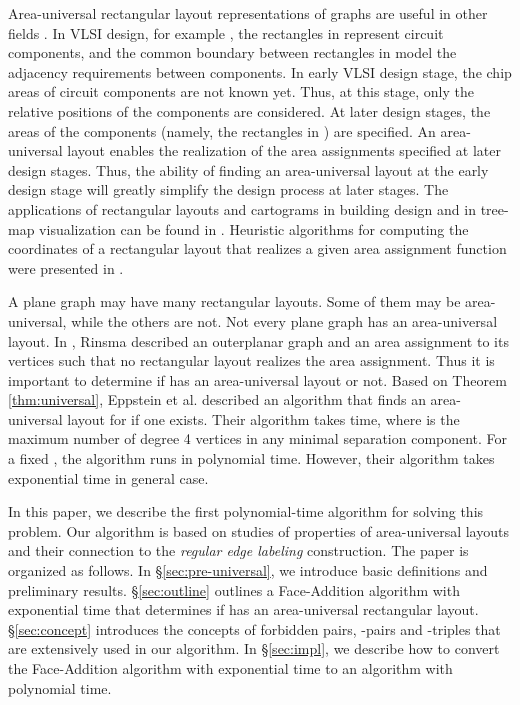 \documentclass[11pt]{article}
\begin{document}
Area-universal rectangular layout representations of graphs are useful
in other fields \cite{Mu08}. In VLSI design, for example \cite{YS95},
the rectangles in  represent circuit components, and the common
boundary between rectangles in  model the adjacency requirements
between components. In early VLSI design stage, the chip areas of circuit
components are not known yet. Thus, at this stage, only the relative
positions of the components are considered. At later design stages, the
areas of the components (namely, the rectangles in ) are specified.
An area-universal layout  enables the realization of the area
assignments specified at later design stages. Thus, the ability of
finding an area-universal layout at the early
design stage will greatly simplify the design process at later stages.
The applications of rectangular layouts and cartograms in building design
and in tree-map visualization can be found in \cite{EM79,BHW00}.
Heuristic algorithms for computing the coordinates of a rectangular layout
that realizes a given area assignment function were presented in \cite{WKC88,KS07}.

A plane graph  may have many rectangular layouts. Some of them
may be area-universal, while the others are not. Not every plane graph
has an area-universal layout. In \cite{Ri87}, Rinsma described an
outerplanar graph  and an area assignment to its vertices such that
no rectangular layout realizes the area assignment.
Thus it is important to determine if  has an area-universal layout
or not. Based on Theorem \ref{thm:universal}, Eppstein et al.
 described an algorithm that finds an area-universal
layout for  if one exists. Their algorithm takes 
time, where  is the maximum number of degree 4 vertices in any minimal
separation component. For a fixed , the algorithm runs in polynomial
time. However, their algorithm takes exponential time in general case.

In this paper, we describe the first polynomial-time algorithm for
solving this problem. Our algorithm is based on studies of properties of
area-universal layouts and their connection to the {\em regular edge
labeling} construction.
The paper is organized as follows. In \S \ref{sec:pre-universal}, we introduce
basic definitions and preliminary results. \S \ref{sec:outline} outlines
a Face-Addition algorithm with exponential time that determines if 
has an area-universal rectangular layout. \S \ref{sec:concept} introduces the
concepts of forbidden pairs, -pairs and -triples that are extensively used
in our algorithm. In \S \ref{sec:impl}, we describe how to convert
the Face-Addition algorithm with exponential time to an algorithm with
polynomial time.
\end{document}

